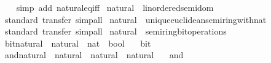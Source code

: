 \begin{isabellebody}
%
\isadelimproof
\ \ %
\endisadelimproof
%
\isatagproof
{}\isamarkupfalse%
\ {\isacharparenleft}{\kern0pt}simp\ add{\isacharcolon}{\kern0pt}\ natural{\isacharunderscore}{\kern0pt}eq{\isacharunderscore}{\kern0pt}iff{\isacharparenright}{\kern0pt}%
\endisatagproof
{\isafoldproof}%
%
\isadelimproof
\isanewline
%
\endisadelimproof
\isanewline
{}\isamarkupfalse%
\ natural\ {\isacharcolon}{\kern0pt}{\isacharcolon}{\kern0pt}\ linordered{\isacharunderscore}{\kern0pt}semidom\isanewline
%
\isadelimproof
\ \ %
\endisadelimproof
%
\isatagproof
{}\isamarkupfalse%
\ {\isacharparenleft}{\kern0pt}standard{\isacharsemicolon}{\kern0pt}\ transfer{\isacharparenright}{\kern0pt}\ simp{\isacharunderscore}{\kern0pt}all%
\endisatagproof
{\isafoldproof}%
%
\isadelimproof
\isanewline
%
\endisadelimproof
\isanewline
{}\isamarkupfalse%
\ natural\ {\isacharcolon}{\kern0pt}{\isacharcolon}{\kern0pt}\ unique{\isacharunderscore}{\kern0pt}euclidean{\isacharunderscore}{\kern0pt}semiring{\isacharunderscore}{\kern0pt}with{\isacharunderscore}{\kern0pt}nat\isanewline
%
\isadelimproof
\ \ %
\endisadelimproof
%
\isatagproof
{}\isamarkupfalse%
\ {\isacharparenleft}{\kern0pt}standard{\isacharsemicolon}{\kern0pt}\ transfer{\isacharparenright}{\kern0pt}\ simp{\isacharunderscore}{\kern0pt}all%
\endisatagproof
{\isafoldproof}%
%
\isadelimproof
\isanewline
%
\endisadelimproof
\isanewline
{}\isamarkupfalse%
\ natural\ {\isacharcolon}{\kern0pt}{\isacharcolon}{\kern0pt}\ semiring{\isacharunderscore}{\kern0pt}bit{\isacharunderscore}{\kern0pt}operations\isanewline
{}\isanewline
\isanewline
{}\isamarkupfalse%
\ bit{\isacharunderscore}{\kern0pt}natural\ {\isacharcolon}{\kern0pt}{\isacharcolon}{\kern0pt}\ {\isacartoucheopen}natural\ {\isasymRightarrow}\ nat\ {\isasymRightarrow}\ bool{\isacartoucheclose}\isanewline
\ \ \ bit%
\isadelimproof
\ %
\endisadelimproof
%
\isatagproof
\isacommand{{\isachardot}{\kern0pt}}\isamarkupfalse%
%
\endisatagproof
{\isafoldproof}%
%
\isadelimproof
%
\endisadelimproof
\isanewline
\isanewline
{}\isamarkupfalse%
\ and{\isacharunderscore}{\kern0pt}natural\ {\isacharcolon}{\kern0pt}{\isacharcolon}{\kern0pt}\ {\isacartoucheopen}natural\ {\isasymRightarrow}\ natural\ {\isasymRightarrow}\ natural{\isacartoucheclose}\isanewline
\ \ \ {\isacartoucheopen}and{\isacartoucheclose}%
\isadelimproof
\ %
\endisadelimproof
%
\isatagproof
\isacommand{{\isachardot}{\kern0pt}}\isamarkupfalse%

\end{isabellebody}
